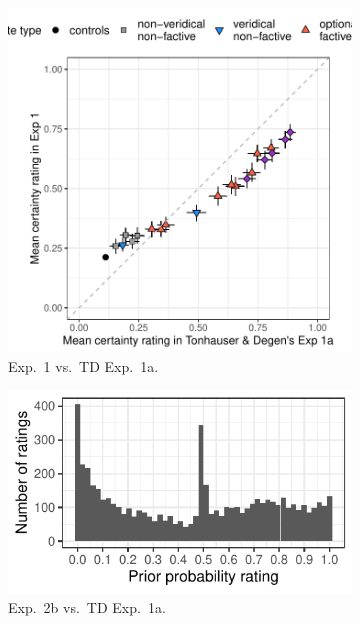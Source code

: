 \documentclass[11pt,fleqn]{article}
\newcommand{\6}{\mbox{$[\hspace*{-.6mm}[$}}
\newcommand{\9}{\mbox{$]\hspace*{-.6mm}]$}}
\begin{document}
\begin{figure}[h!]
\begin{subfigure}{.33\textwidth}
\includegraphics[width=\textwidth]{../../results/9-prior-projection/graphs/projection-comparison}
\caption{Exp.~1 vs.\ TD Exp.~1a.}
\label{f-projcomp1}
\end{subfigure}
\begin{subfigure}{.33\textwidth}
\includegraphics[width=\textwidth]{../../results/9-prior-projection/graphs/bunching-prior}
\caption{Exp.~2b vs.\ TD Exp.~1a.}
\label{f-projcomp2}
\end{subfigure}
\begin{subfigure}{.33\textwidth}

\end{subfigure}
\end{figure}
\end{document}

